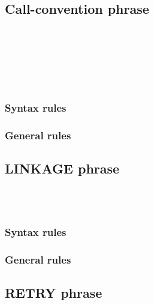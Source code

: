 \subsection{Call-convention phrase}

\begin{syntax}[\miscextcolour]
  \begin{0-1}
     \\
     \\
     \\
     \\
     \\
    \mnemonicname
  \end{0-1}
\end{syntax}

\subsubsection{Syntax rules}

\subsubsection{General rules}

\subsection{LINKAGE phrase}

\begin{syntax}[\miscextcolour]
  \begin{0-1}
     \\
     \\

  \end{0-1}
\end{syntax}

\subsubsection{Syntax rules}

\subsubsection{General rules}

\subsection{RETRY phrase}


